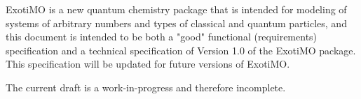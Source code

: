 \label{Purpose}

ExotiMO is a new quantum chemistry package that is intended
for modeling of systems of arbitrary numbers and types of 
classical and quantum particles, and 
this document is intended to be both a "good"\cite{spolsky-spec} functional (\ie requirements) 
specification and a technical specification of Version 1.0 of the ExotiMO package.  
This specification will be updated for future versions of ExotiMO.

The current draft is a work-in-progress and therefore incomplete.

